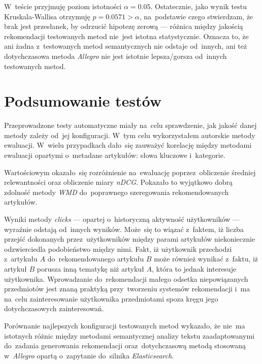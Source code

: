 \documentclass[pl]{minipw} %
\begin{document}
W~teście przyjmuję poziom istotności $\alpha=0.05$. Ostatecznie, jako wynik testu Kruskala-Wallisa otrzymuję $p=0.0571>\alpha$, na~podstawie czego stwierdzam, że brak jest przesłanek, by odrzucić hipotezę zerową --- różnica między jakością rekomendacji testowanych metod nie~jest istotna statystycznie. Oznacza to, że ani żadna z~testowanych metod semantycznych nie odstaje od~innych, ani też dotychczasowa metoda \textit{Allegro} nie jest istotnie lepsza/gorsza od~innych testowanych metod.

\section{Podsumowanie testów}

Przeprowadzone testy automatyczne miały na~celu sprawdzenie, jak jakość danej metody zależy od~jej konfiguracji. W~tym celu wykorzystałem autorskie metody ewaluacji. W~wielu przypadkach dało~się zauważyć korelację między metodami ewaluacji opartymi o~metadane artykułów: słowa kluczowe i~kategorie.

Wartościowym okazało~się rozróżnienie na~ewaluację poprzez~obliczenie średniej relewantności oraz obliczenie miary \textit{nDCG}. Pokazało to wyjątkowo dobrą zdolność metody \textit{WMD} do~poprawnego szeregowania rekomendowanych artykułów.

Wyniki metody \textit{clicks} --- opartej o~historyczną aktywność użytkowników --- wyraźnie odstają od~innych wyników. Może~się to wiązać z~faktem, iż liczba przejść dokonanych przez~użytkowników między parami artykułów niekoniecznie odzwierciedla podobieństwo między nimi. Fakt, iż użytkownik przechodzi z~artykułu $A$ do~rekomendowanego artykułu $B$ może również wynikać z~faktu, iż artykuł $B$ porusza inną tematykę niż artykuł $A$, która to jednak interesuje użytkownika. Wprowadzanie do~rekomendacji małego odsetka niepowiązanych przedmiotów jest znaną praktyką przy~tworzeniu systemów rekomendacji i~ma na~celu zainteresowanie użytkownika przedmiotami spoza kręgu jego dotychczasowych zainteresowań.

Porównanie najlepszych konfiguracji testowanych metod wykazało, że nie~ma istotnych różnic między metodami semantycznej analizy tekstu zaadaptowanymi do~zadania generowania rekomendacji oraz~dotychczasową metodą stosowaną w~\textit{Allegro} opartą o~zapytanie do~silnika \textit{Elasticsearch}.

\end{document}
